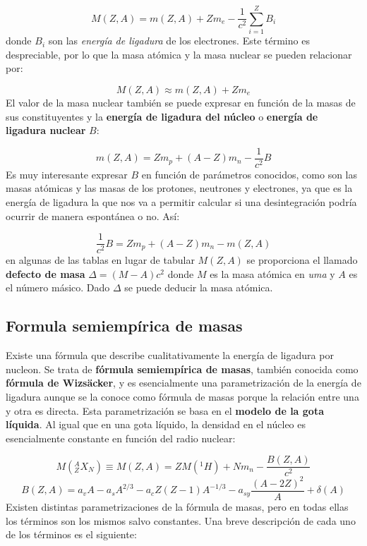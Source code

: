 \begin{equation}
	M(Z,A) = m(Z,A)+ Zm_e - \frac{1}{c^2} \sum_{i=1}^Z B_i
\end{equation}
donde $B_i$ son las \textit{energía de ligadura} de los electrones. Este término es despreciable, por lo que la masa atómica y la masa nuclear se pueden relacionar por:

\begin{equation}
	M(Z,A) \approx m(Z,A) + Zm_e
\end{equation}
El valor de la masa nuclear también se puede expresar en función de la masas de sus constituyentes y la \textbf{energía de ligadura del núcleo} o \textbf{energía de ligadura nuclear} $B$:

\begin{equation}
	m(Z,A) =Zm_p + (A-Z)m_n - \frac{1}{c^2} B
\end{equation}
Es muy interesante expresar $B$ en función de parámetros conocidos, como son las masas atómicas y las masas de los protones, neutrones y electrones, ya que es la energía de ligadura la que nos va a permitir calcular si una desintegración podría ocurrir de manera espontánea o no. Así:

\begin{equation}
	\frac{1}{c^2} B = Zm_p + (A-Z)m_n - m(Z,A)
\end{equation}
en algunas de las tablas en lugar de tabular $M(Z,A)$ se proporciona el llamado \textbf{defecto de masa} $\Delta = (M-A)c^2$ donde $M$ es la masa atómica en \textit{uma} y $A$ es el número másico. Dado $\Delta$ se puede deducir la masa atómica.



\subsection{Formula semiempírica de masas}

Existe una fórmula que describe cualitativamente la energía de ligadura por nucleon. Se trata de \textbf{fórmula semiempírica de masas}, también conocida como \textbf{fórmula de Wizsäcker}, y es esencialmente una parametrización de la energía de ligadura aunque se la conoce como fórmula de masas porque la relación entre una y otra es directa. Esta parametrización se basa en el \textbf{modelo de la gota líquida}. Al igual que en una gota líquido, la densidad en el núcleo es esencialmente constante en función del radio nuclear:

\begin{equation}
	M(^A_ZX_N) \equiv M(Z,A) = ZM(^1 H) + Nm_n - \frac{B(Z,A)}{c^2}
\end{equation}
\begin{equation}
	B(Z,A) = a_v A - a_s A^{2/3} - a_c Z(Z-1) A^{-1/3} - a_{sy} \frac{(A-2Z)^2}{A} + \delta (A)
\end{equation}
Existen distintas parametrizaciones de la fórmula de masas, pero en todas ellas los términos son los mismos salvo constantes. Una breve descripción de cada uno de los términos es el siguiente:

